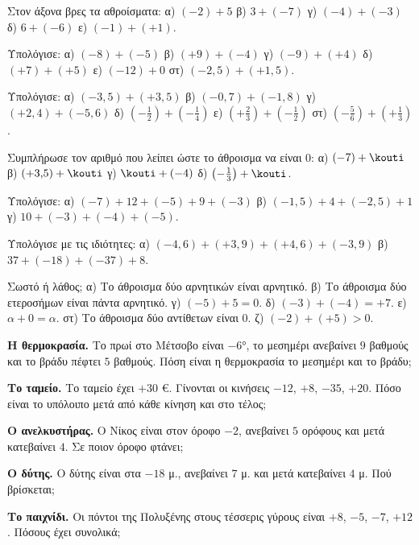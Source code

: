 

\ex Στον άξονα βρες τα αθροίσματα: α) $(-2)+5$ \quad β) $3+(-7)$ \quad γ) $(-4)+(-3)$ \quad δ) $6+(-6)$ \quad ε) $(-1)+(+1)$.

\ex Υπολόγισε: α) $(-8)+(-5)$ \quad β) $(+9)+(-4)$ \quad γ) $(-9)+(+4)$ \quad δ) $(+7)+(+5)$ \quad ε) $(-12)+0$ \quad στ) $(-2{,}5)+(+1{,}5)$.

\ex Υπολόγισε: α) $(-3{,}5)+(+3{,}5)$ \quad β) $(-0{,}7)+(-1{,}8)$ \quad γ) $(+2{,}4)+(-5{,}6)$ \quad δ) $\left(-\frac{1}{2}\right)+\left(-\frac{1}{4}\right)$ \quad ε) $\left(+\frac{2}{3}\right)+\left(-\frac{1}{2}\right)$ \quad στ) $\left(-\frac{5}{6}\right)+\left(+\frac{1}{3}\right)$.

\ex Συμπλήρωσε τον αριθμό που λείπει ώστε το άθροισμα να είναι $0$: α) $(-7)+\kouti$ \quad β) $(+3{,}5)+\kouti$ \quad γ) $\kouti+(-4)$ \quad δ) $\left(-\frac{1}{3}\right)+\kouti$.

\ex Υπολόγισε: α) $(-7)+12+(-5)+9+(-3)$ \quad β) $(-1{,}5)+4+(-2{,}5)+1$ \quad γ) $10+(-3)+(-4)+(-5)$.

\ex Υπολόγισε με τις ιδιότητες: α) $(-4{,}6)+(+3{,}9)+(+4{,}6)+(-3{,}9)$ \quad β) $37+(-18)+(-37)+8$.

\ex Σωστό ή λάθος; α) Το άθροισμα δύο αρνητικών είναι αρνητικό. \quad β) Το άθροισμα δύο ετεροσήμων είναι πάντα αρνητικό. \quad γ) $(-5)+5=0$. \quad δ) $(-3)+(-4)=+7$. \quad ε) $\alpha+0=\alpha$. \quad στ) Το άθροισμα δύο αντίθετων είναι $0$. \quad ζ) $(-2)+(+5)>0$.


\ex \textbf{Η θερμοκρασία.} Το πρωί στο Μέτσοβο είναι $-6$°, το μεσημέρι ανεβαίνει $9$ βαθμούς και το βράδυ πέφτει $5$ βαθμούς. Πόση είναι η θερμοκρασία το μεσημέρι και το βράδυ;

\ex \textbf{Το ταμείο.} Το ταμείο έχει $+30$ €. Γίνονται οι κινήσεις $-12$, $+8$, $-35$, $+20$. Πόσο είναι το υπόλοιπο μετά από κάθε κίνηση και στο τέλος;

\ex \textbf{Ο ανελκυστήρας.} Ο Νίκος είναι στον όροφο $-2$, ανεβαίνει $5$ ορόφους και μετά κατεβαίνει $4$. Σε ποιον όροφο φτάνει;

\ex \textbf{Ο δύτης.} Ο δύτης είναι στα $-18$ μ., ανεβαίνει $7$ μ. και μετά κατεβαίνει $4$ μ. Πού βρίσκεται;

\ex \textbf{Το παιχνίδι.} Οι πόντοι της Πολυξένης στους τέσσερις γύρους είναι $+8$, $-5$, $-7$, $+12$. Πόσους έχει συνολικά;

